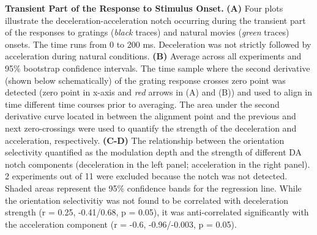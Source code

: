 \textbf{Transient Part of the Response to Stimulus Onset.} \textbf{(A)} Four
plots illustrate the deceleration-acceleration notch occurring during the
transient part of the responses to gratings (\textit{black} traces) and natural
movies (\textit{green} traces) onsets. The time runs from 0 to 200 ms. Deceleration
was not strictly followed by acceleration during natural conditions.
\textbf{(B)} Average across all experiments and 95\% bootstrap confidence
intervals. The time sample where the second derivative (shown below
schematically) of the grating response crosses zero point was detected
(zero point in x-axis and \textit{red} arrows in (A) and (B)) and used to
align in time different time courses prior to averaging. The area under the
second derivative curve located in between the alignment point and the
previous and next zero-crossings were used to quantify the strength of the
deceleration and acceleration, respectively.  \textbf{(C-D)} The
relationship between the orientation selectivity quantified as the
modulation depth and the strength of different DA notch components
(deceleration in the left panel; acceleration in the right panel). 2
experiments out of 11 were excluded because the notch was not detected.
Shaded areas represent the 95\% confidence bands for the regression line.
While the orientation selectivitiy was not found to be correlated with
deceleration strength (r = 0.25, -0.41/0.68, p = 0.05), it was
anti-correlated significantly with the acceleration component (r = -0.6,
-0.96/-0.003, p = 0.05).


